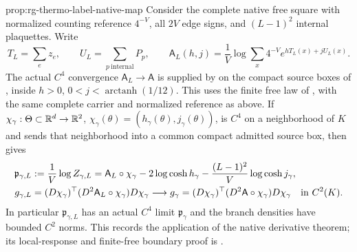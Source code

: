 {prop:rg-thermo-label-native-map}
Consider the complete native free square with normalized counting
reference $4^{-V}$, all $2V$ edge signs, and $(L-1)^2$ internal
plaquettes. Write
\begin{equation}
 T_L=\sum_e z_e,\qquad U_L=\sum_{p\ \mathrm{internal}}P_p,\qquad
 \mathsf A_L(h,j)=\frac1V\log\sum_x4^{-V}
                         e^{hT_L(x)+jU_L(x)}.
 \label{eq:rg-thermo-label-natural-pressure}
\end{equation}
The actual $C^4$ convergence $\mathsf A_L\to\mathsf A$ is supplied by
 on the compact source boxes
of , inside
$h>0$, $0<j<\operatorname{arctanh}(1/12)$. This uses the finite free
law of , with the same complete
carrier and normalized reference as above. If
$\chi_\gamma:\Theta\subset\mathbb R^d\to\mathbb R^2$,
$\chi_\gamma(\theta)=(h_\gamma(\theta),j_\gamma(\theta))$, is $C^4$
on a neighborhood of $K$ and sends that neighborhood into a common
compact admitted source box, then
 gives
\begin{align}
 \mathfrak p_{\gamma,L}
 &:=\frac1V\log Z_{\gamma,L}
 =\mathsf A_L\circ\chi_\gamma-2\log\cosh h_\gamma
   -\frac{(L-1)^2}{V}\log\cosh j_\gamma,
 \label{eq:rg-thermo-label-raw-pressure}\\
 g_{\gamma,L}
 &=(D\chi_\gamma)^\top
       (D^2\mathsf A_L\circ\chi_\gamma)D\chi_\gamma
 \longrightarrow
 g_\gamma=(D\chi_\gamma)^\top
       (D^2\mathsf A\circ\chi_\gamma)D\chi_\gamma
 \quad\hbox{in }C^2(K).
 \label{eq:rg-thermo-label-native-pullback}
\end{align}
In particular $\mathfrak p_{\gamma,L}$ has an actual $C^4$ limit
$\mathfrak p_\gamma$ and the branch densities have bounded $C^2$ norms.
This records the application of the native derivative theorem; its
local-response and finite-free boundary proof is
.\thermoestablishedstatus


